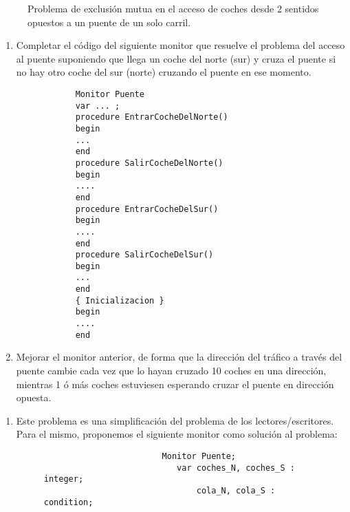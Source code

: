 \begin{ejercicio}
\begin{figure}
        \caption{\centering  Problema de exclusión mutua en el acceso de coches desde 2 sentidos opuestos a un puente de un solo carril.}
        \label{fig:ej2.2.6}
    \end{figure}
    \begin{enumerate}
        \item Completar el código del siguiente monitor que resuelve el problema del acceso al puente suponiendo que llega un coche del norte (sur) y cruza el puente si no hay otro coche del sur (norte) cruzando el puente en ese momento.
        \begin{verbatim}
            Monitor Puente
            var ... ;
            procedure EntrarCocheDelNorte()
            begin
            ...
            end
            procedure SalirCocheDelNorte()
            begin
            ....
            end
            procedure EntrarCocheDelSur()
            begin
            ....
            end
            procedure SalirCocheDelSur()
            begin
            ...
            end
            { Inicializacion }
            begin
            ....
            end
        \end{verbatim}

        \item Mejorar el monitor anterior, de forma que la dirección del tráfico a través del puente cambie cada vez que lo hayan cruzado 10 coches en una dirección, mientras 1 ó más coches estuviesen esperando cruzar el puente en dirección opuesta.
    \end{enumerate}    

    \begin{enumerate}
        \item Este problema es una simplificación del problema de los lectores/escritores. Para el mismo, proponemos el siguiente monitor como solución al problema:
            \begin{figure}[H]
                \centering
                \setlength{\columnsep}{1cm}
                \begin{multicols}{2}
                    \begin{verbatim}
                        Monitor Puente;
                           var coches_N, coches_S : integer;
                               cola_N, cola_S : condition;


\end{verbatim}
\end{multicols}
\end{figure}
\end{enumerate}
\end{ejercicio}

